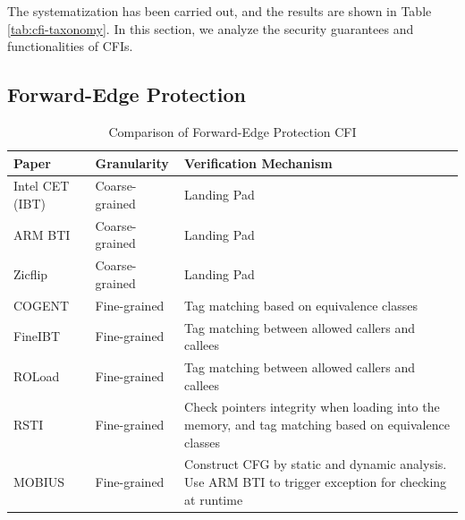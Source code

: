 \documentclass[journal,onecolumn]{IEEEtran}
\begin{document}
The systematization has been carried out, and the results are shown in Table \ref{tab:cfi-taxonomy}. In this section, we analyze the security guarantees and functionalities of CFIs.

\subsection{Forward-Edge Protection} \label{sec:forward}

\begin{table}[t]
	\centering
	\caption{Comparison of Forward-Edge Protection CFI}
	\label{tab:forward-edge}
	\renewcommand{\arraystretch}{1.35}
	\setlength{\tabcolsep}{3.5pt}
	
	\begin{tabularx}{\columnwidth}{
			>{\raggedright\arraybackslash}p{}
			>{\centering\arraybackslash}p{}
			>{\raggedright\arraybackslash}X
		}
		\toprule
		\textbf{Paper} &
		\textbf{Granularity} &
		\textbf{Verification Mechanism} \\
		\midrule
		
		Intel CET (IBT)\cite{IntelIBT} &
		Coarse-grained &
		Landing Pad \\[2pt]
		
		ARM BTI \cite{ARMBTI} &
		Coarse-grained &
		Landing Pad\\[2pt]
		
		Zicflip \cite{RISCVInstructionSet} &
		Coarse-grained&
		Landing Pad\\[2pt]
		
		COGENT \cite{Demicco25} &
		Fine-grained &
		Tag matching based on equivalence classes \\[2pt]
		
		FineIBT \cite{Gaidis23} &
		Fine-grained &
		Tag matching between allowed callers and callees \\[2pt]
		
		ROLoad \cite{Tan22} &
		Fine-grained &
		Tag matching between allowed callers and callees \\[2pt]
		
		RSTI \cite{Ismail24} &
		Fine-grained &
		Check pointers integrity when loading into the memory, and tag matching based on equivalence classes\\[2pt]
		
		MOBIUS \cite{Yue25} &
		Fine-grained &
		Construct CFG by static and dynamic analysis. Use ARM BTI to trigger exception for checking at runtime \\[2pt]
		

\end{tabularx}
\end{table}
\end{document}
